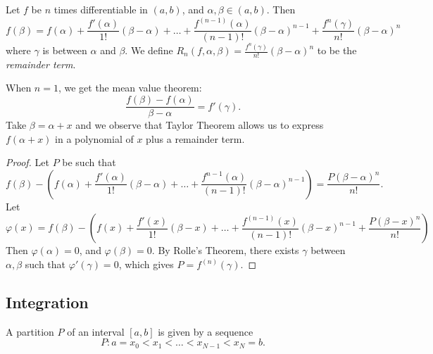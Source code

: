 \begin{theorem}
	Let $f$ be $n$ times differentiable in $(a,b)$, and $\alpha, \beta \in (a,b)$. Then
	\[
		f(\beta) = f(\alpha) + \frac{f'(\alpha)}{1!}(\beta - \alpha) + \ldots + \frac{f^{(n-1)}(\alpha)}{(n-1)!}(\beta - \alpha)^{n-1}
		+ \frac{f^n (\gamma)}{n!}(\beta - \alpha)^n
	\]
	where $\gamma$ is between $\alpha$ and $\beta$. We define $R_n(f, \alpha, \beta) =  \frac{f^n (\gamma)}{n!}(\beta - \alpha)^n$ to be the \textit{remainder term}.
\end{theorem}
\begin{observation}
	When $n=1$, we get the mean value theorem:
	\[
		\frac{f(\beta) - f(\alpha)}{\beta - \alpha} = f'(\gamma)
	.\] 
	Take $\beta  = \alpha+x$ and we observe that Taylor Theorem allows us to express $f(\alpha+x)$ in a polynomial of $x$ plus a remainder term.
\end{observation}
\begin{proof}
	Let $P$ be such that \[
		f(\beta) - \left( f(\alpha)+\frac{f'(\alpha)}{1!}(\beta - \alpha) + \ldots + \frac{f^{n-1}(\alpha)}{(n-1)!}(\beta - \alpha)^{n-1} \right)  = \frac{P(\beta - \alpha)^n}{n!}
	.\] 
	Let
	\[
		\varphi(x) = f(\beta) - \left( f(x) + \frac{f'(x)}{1!} (\beta - x) + \ldots + \frac{f^{(n -1)}(x)}{(n-1)!} (\beta - x)^{n -1} + \frac{P(\beta - x)^n}{n!}\right)
	\]
	Then $\varphi(\alpha) = 0$, and $\varphi(\beta) = 0$. By Rolle's Theorem, there exists $\gamma$ between $\alpha, \beta$ such that $\varphi'(\gamma) = 0$, which gives $P = f^{(n)}(\gamma)$.
\end{proof}

\subsection{Integration}

A partition $P$ of an interval $[a,b]$ is given by a sequence 
\[
	P: a = x_0<x_1<\ldots <x_{N-1}<x_N = b
.\] 

